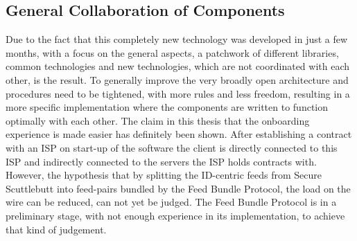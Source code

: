 \subsection{General Collaboration of Components}
Due to the fact that this completely new technology was developed in just a few months, with a focus on the general aspects, a patchwork of different libraries, common technologies and new technologies, which are not coordinated with each other, is the result. To generally improve the very broadly open architecture and procedures need to be tightened, with more rules and less freedom, resulting in a more specific implementation where the components are written to function optimally with each other.  The claim in this thesis that the onboarding experience is made easier has definitely been shown. After establishing a contract with an ISP on start-up of the software the client is directly connected to this ISP and indirectly connected to the  servers the ISP holds contracts with. However, the hypothesis that by splitting the ID-centric feeds from Secure Scuttlebutt into feed-pairs bundled by the Feed Bundle Protocol, the load on the wire can be reduced, can not yet be judged. The Feed Bundle Protocol is in a preliminary stage, with not enough experience in its implementation, to achieve that kind of judgement.
